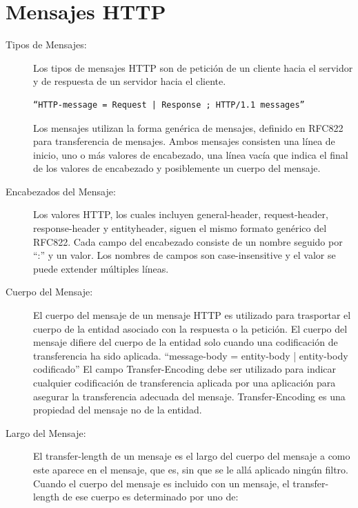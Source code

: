 \section{Mensajes HTTP}

\begin{description}
\item[Tipos de Mensajes:] 

Los tipos de mensajes HTTP son de petición de un cliente hacia el servidor y de respuesta de un servidor hacia el cliente.

\begin{verbatim}
“HTTP-message = Request | Response ; HTTP/1.1 messages”
\end{verbatim}

Los mensajes utilizan la forma genérica de mensajes, definido en RFC822 para transferencia de mensajes. Ambos mensajes consisten una línea de inicio, uno o más valores de encabezado, una línea vacía que indica el final de los valores de encabezado y posiblemente un cuerpo del mensaje.

\item[Encabezados del Mensaje:] 
Los valores HTTP, los cuales incluyen general-header, request-header, response-header y entityheader, siguen el mismo formato genérico del RFC822. Cada campo del encabezado consiste de un nombre seguido por “:” y un valor. Los nombres de campos son case-insensitive y el valor se puede extender múltiples líneas.
\item[Cuerpo del Mensaje:] 

El cuerpo del mensaje de un mensaje HTTP es utilizado para trasportar el cuerpo de la entidad asociado con la respuesta o la petición. El cuerpo del mensaje difiere del cuerpo de la entidad solo cuando una codificación de transferencia ha sido aplicada. “message-body = entity-body | entity-body codificado”  
El campo Transfer-Encoding debe ser utilizado para indicar cualquier codificación de transferencia aplicada por una aplicación para asegurar la transferencia adecuada del mensaje. Transfer-Encoding es una propiedad del mensaje no de la entidad.

\item[Largo del Mensaje:] 

El transfer-length de un mensaje es el largo del cuerpo del mensaje a como este aparece en el mensaje, que es, sin que se le allá aplicado ningún filtro. Cuando el cuerpo del mensaje es incluido con un mensaje, el transfer-length de ese cuerpo es determinado por uno de:
\begin{itemize}


\end{itemize}
\end{description}
